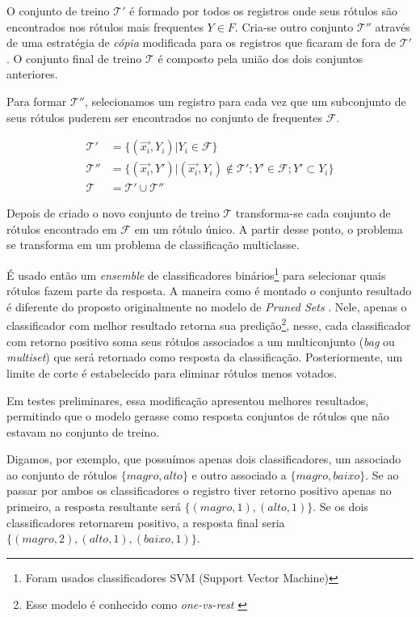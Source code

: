\documentclass[runningheads,a4paper]{llncs}
\begin{document}
O conjunto de treino $\mathcal{T'}$ é formado por todos os registros onde seus rótulos são encontrados nos rótulos mais frequentes $Y \in F$. Cria-se outro conjunto $\mathcal{T''}$ através de uma estratégia de \textit{cópia} modificada para os registros que ficaram de fora de $\mathcal{T'}$. O conjunto final de treino $\mathcal{T}$ é composto pela união dos dois conjuntos anteriores.

Para formar $\mathcal{T''}$, selecionamos um registro para cada vez que um subconjunto de seus rótulos puderem ser encontrados no conjunto de frequentes $\mathcal{F}$.

\begin{align*}
\mathcal{T'} &= \{(\vec{x_i}, Y_i) | Y_i \in \mathcal{F}\} \\
\mathcal{T''} &=  \{(\vec{x_i}, Y') | (\vec{x_i}, Y_i) \notin \mathcal{T'}; Y' \in \mathcal{F}; Y' \subset Y_i \} \\
\mathcal{T} &=  \mathcal{T'} \cup \mathcal{T''}
\end{align*}

Depois de criado o novo conjunto de treino $\mathcal{T}$ transforma-se cada conjunto de rótulos encontrado em $\mathcal{F}$ em um rótulo único. A partir desse ponto, o problema se transforma em um problema de classificação multiclasse.

É usado então um \textit{ensemble} de classificadores binários\footnote{Foram usados classificadores SVM (Support Vector Machine)} para selecionar quais rótulos fazem parte da resposta. A maneira como é montado o conjunto resultado é diferente do proposto originalmente no modelo de \textit{Pruned Sets} \cite{Read2008-bt}. Nele, apenas o classificador com melhor resultado retorna sua predição\footnote{Esse modelo é conhecido como \textit{one-vs-rest} \cite{Bishop2006-vm}}, nesse, cada classificador com retorno positivo soma seus rótulos associados a um multiconjunto (\textit{bag} ou \textit{multiset}) que será retornado como resposta da classificação. Posteriormente, um limite de corte é estabelecido para eliminar rótulos menos votados.

Em testes preliminares, essa modificação apresentou melhores resultados, permitindo que o modelo gerasse como resposta conjuntos de rótulos que não estavam no conjunto de treino.

Digamos, por exemplo, que possuímos apenas dois classificadores, um associado ao conjunto de rótulos $\{magro, alto\}$ e outro associado a $\{magro, baixo\}$. Se ao passar por ambos os classificadores o registro tiver retorno positivo apenas no primeiro, a resposta resultante será $\{(magro, 1), (alto, 1)\}$. Se os dois classificadores retornarem positivo, a resposta final seria $\{(magro, 2), (alto, 1), (baixo, 1)\}$.
\end{document}
